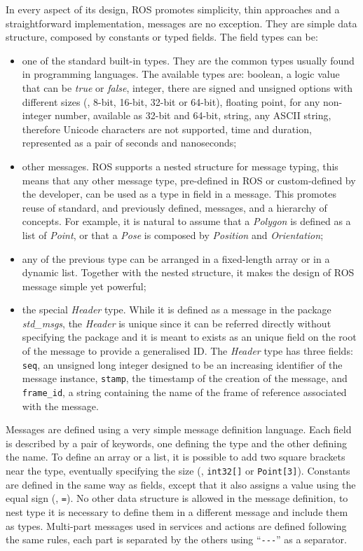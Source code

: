 In every aspect of its design, ROS promotes simplicity, thin approaches and a straightforward implementation, messages are no exception. They are simple data structure, composed by constants or typed fields. The field types can be:
\begin{itemize}
\item one of the standard built-in types. They are the common types usually found in programming languages. The available types are: boolean, a logic value that can be \textit{true} or \textit{false}, integer, there are signed and unsigned options with different sizes (\ie, 8-bit, 16-bit, 32-bit or 64-bit), floating point, for any non-integer number, available as 32-bit and 64-bit, string, any ASCII string, therefore Unicode characters are not supported, time and duration, represented as a pair of seconds and nanoseconds;
\item other messages. ROS supports a nested structure for message typing, this means that any other message type, pre-defined in ROS or custom-defined by the developer, can be used as a type in field in a message. This promotes reuse of standard, and previously defined, messages, and a hierarchy of concepts. For example, it is natural to assume that a \textit{Polygon} is defined as a list of \textit{Point}, or that a \textit{Pose} is composed by \textit{Position} and \textit{Orientation};
\item any of the previous type can be arranged in a fixed-length array or in a dynamic list. Together with the nested structure, it makes the design of ROS message simple yet powerful;
\item the special \textit{Header} type. While it is defined as a message in the package \textit{std\_msgs}, the \textit{Header} is unique since it can be referred directly without specifying the package and it is meant to exists as an unique field on the root of the message to provide a generalised ID. The \textit{Header} type has three fields: \texttt{seq}, an unsigned long integer designed to be an increasing identifier of the message instance, \texttt{stamp}, the timestamp of the creation of the message, and \texttt{frame\_id}, a string containing the name of the frame of reference associated with the message.
\end{itemize}

Messages are defined using a very simple message definition language. Each field is described by a pair of keywords, one defining the type and the other defining the name. To define an array or a list, it is possible to add two square brackets near the type, eventually specifying the size (\eg, \texttt{int32[]} or \texttt{Point[3]}). Constants are defined in the same way as fields, except that it also assigns a value using the equal sign (\ie, \texttt{=}). No other data structure is allowed in the message definition, to nest type it is necessary to define them in a different message and include them as types. Multi-part messages used in services and actions are defined following the same rules, each part is separated by the others using ``\texttt{-{}-{}-}'' as a separator.


